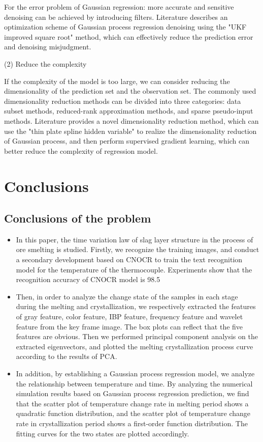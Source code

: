 \documentclass{apmcmthesis}
\begin{document}
For the error problem of Gaussian regression: more accurate and sensitive denoising can be achieved by introducing filters. Literature \cite{lbq} describes an optimization scheme of Gaussian process regression denoising using the "UKF improved square root" method, which can effectively reduce the prediction error and denoising misjudgment.

\noindent(2) Reduce the complexity

If the complexity of the model is too large, we can consider reducing the dimensionality of the prediction set and the observation set. The commonly used dimensionality reduction methods can be divided into three categories: data subset methods, reduced-rank approximation methods, and sparse pseudo-input methods. Literature\cite{jwff} provides a novel dimensionality reduction method, which can use the "thin plate spline hidden variable" to realize the dimensionality reduction of Gaussian process, and then perform supervised gradient learning, which can better reduce the complexity of regression model.


\section{Conclusions}

\subsection{Conclusions of the problem}
\begin{itemize}
\item In this paper, the time variation law of slag layer structure in the process of ore smelting is studied. Firstly, we recognize the training images, and conduct a secondary development based on CNOCR to train the text recognition model for the temperature of the thermocouple. Experiments show that the recognition accuracy of CNOCR model is 98.5%

\item Then, in order to analyze the change state of the samples in each stage during the melting and crystallization, we respectively extracted the features of gray feature, color feature, IBP feature, frequency feature and wavelet feature from the key frame image. The box plots can reflect that the five features are obvious. Then we performed principal component analysis on the extracted eigenvectors, and plotted the melting crystallization process curve according to the results of PCA.

\item In addition, by establishing a Gaussian process regression model, we analyze the relationship between temperature and time. By analyzing the numerical simulation results based on Gaussian process regression prediction, we find that the scatter plot of temperature change rate in melting period shows a quadratic function distribution, and the scatter plot of temperature change rate in crystallization period shows a first-order function distribution. The fitting curves for the two states are plotted accordingly.
\end{itemize}	
\end{document}
